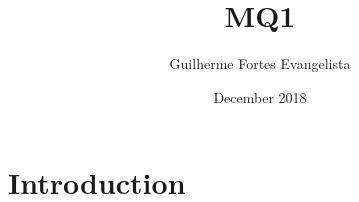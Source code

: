 \documentclass{article}
\title{MQ1}
\author{Guilherme Fortes Evangelista}
\date{December 2018}
\begin{document}
\maketitle

\section{Introduction}
\end{document}
